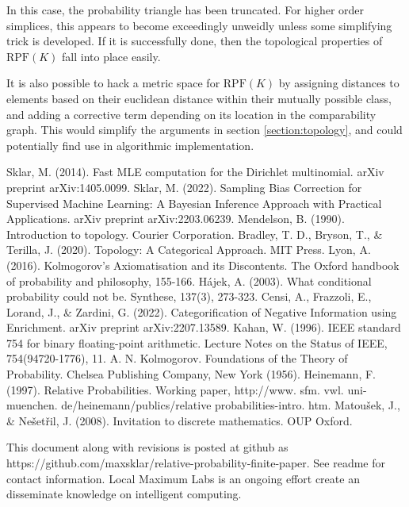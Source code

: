 \documentclass[twoside]{article}
\theoremstyle{plain}%
\theoremstyle{definition}
\theoremstyle{remark}
\begin{document}
In this case, the probability triangle has been truncated. For higher order simplices, this appears to become exceedingly unweidly unless some simplifying trick is developed. If it is successfully done, then the topological properties of \(\text{RPF}(K)\) fall into place easily.

It is also possible to hack a metric space for \(\text{RPF}(K)\) by assigning distances to elements based on their euclidean distance within their mutually possible class, and adding a corrective term depending on its location in the comparability graph. This would simplify the arguments in section \ref{section:topology}, and could potentially find use in algorithmic implementation.

\begin{thebibliography}{20}

Sklar, M. (2014). Fast MLE computation for the Dirichlet multinomial. arXiv preprint arXiv:1405.0099.
Sklar, M. (2022). Sampling Bias Correction for Supervised Machine Learning: A Bayesian Inference Approach with Practical Applications. arXiv preprint arXiv:2203.06239.
Mendelson, B. (1990). Introduction to topology. Courier Corporation.
Bradley, T. D., Bryson, T., \& Terilla, J. (2020). Topology: A Categorical Approach. MIT Press.
Lyon, A. (2016). Kolmogorov’s Axiomatisation and its Discontents. The Oxford handbook of probability and philosophy, 155-166.
Hájek, A. (2003). What conditional probability could not be. Synthese, 137(3), 273-323.
Censi, A., Frazzoli, E., Lorand, J., \& Zardini, G. (2022). Categorification of Negative Information using Enrichment. arXiv preprint arXiv:2207.13589.
Kahan, W. (1996). IEEE standard 754 for binary floating-point arithmetic. Lecture Notes on the Status of IEEE, 754(94720-1776), 11.
A. N. Kolmogorov. Foundations of the Theory of Probability. Chelsea Publishing Company, New York
(1956). 
Heinemann, F. (1997). Relative Probabilities. Working paper, http://www. sfm. vwl. uni-muenchen. de/heinemann/publics/relative probabilities-intro. htm.
Matoušek, J., \& Nešetřil, J. (2008). Invitation to discrete mathematics. OUP Oxford.

\end{thebibliography}

This document along with revisions is posted at github as https://github.com/maxsklar/relative-probability-finite-paper. See readme for contact information. Local Maximum Labs is an ongoing effort create an disseminate knowledge on intelligent computing.
\end{document}
